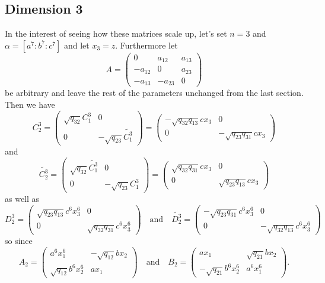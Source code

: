 \documentclass [11pt, proquest] {uwthesis}[2020/02/24]
\begin{document}
\subsection{Dimension 3}
    In the interest of seeing how these matrices scale up, let's set $n=3$ and $\alpha=[a^7:b^7:c^7]$ and let $x_3=z$. Furthermore let
    \[A=\left(\begin{smallmatrix}
        0& a_{12}& a_{13}\\-a_{12}&0&a_{23}\\-a_{13}&-a_{23}&0
    \end{smallmatrix}\right)\]
    be arbitrary and leave the rest of the parameters unchanged from the last section. Then we have 
    \[C_2^3=\begin{pmatrix}
        \sqrt{q_{32}}C_1^3 & 0 \\ 0&-\sqrt{q_{23}}\widetilde{C_1^3}
    \end{pmatrix}=\begin{pmatrix}
        -\sqrt{q_{32}q_{13}}cx_3 & 0\\0& -\sqrt{q_{23}q_{31}}cx_3
    \end{pmatrix}\]
    and
    \[\widetilde{C_2^3}=\begin{pmatrix}
        \sqrt{q_{32}}\widetilde{C_1^3} & 0 \\ 0&-\sqrt{q_{23}}C_1^3
    \end{pmatrix}=\begin{pmatrix}
        \sqrt{q_{32}q_{31}}cx_3 & 0\\0&\sqrt{q_{23}q_{13}}cx_3
    \end{pmatrix}\]
    as well as 
    \[D_2^3=\begin{pmatrix}
        \sqrt{q_{23}q_{13}}c^6x_3^6 & 0\\0& \sqrt{q_{32}q_{31}}c^6x_3^6
    \end{pmatrix}\quad\text{and}\quad\widetilde{D_2^3}=\begin{pmatrix}
        -\sqrt{q_{23}q_{31}}c^6x_3^6&0\\0&-\sqrt{q_{32}q_{13}}c^6x_3^6
    \end{pmatrix}\]
    so since 
    \[A_2=\begin{pmatrix}
        a^6x_1^6 & -\sqrt{q_{12}}bx_2\\ 
        \sqrt{q_{12}}b^6x_2^6 & ax_1
    \end{pmatrix}\quad\text{and}\quad 
    B_2=\begin{pmatrix}
        ax_1 & \sqrt{q_{21}}bx_2\\ 
        -\sqrt{q_{21}}b^6x_2^6 & a^6x_1^6
    \end{pmatrix}.\]
\end{document}
